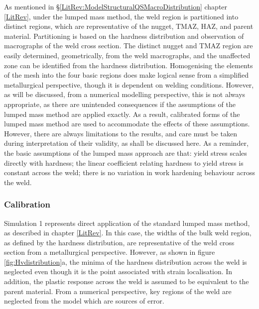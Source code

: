 As mentioned in \S\ref{LitRev:ModelStructuralQSMacroDistribution} chapter \ref{LitRev}, under the lumped mass method, the weld region is partitioned into distinct regions, which are representative of the nugget, TMAZ, HAZ, and parent material. Partitioning is based on the hardness distribution and observation of macrographs of the weld cross section. The distinct nugget and TMAZ region are easily determined, geometrically, from the weld macrographs, and the unaffected zone can be identified from the hardness distribution. Homogenising the elements of the mesh into the four basic regions does make logical sense from a simplified metallurgical perspective, though it is dependent on welding conditions. However, as will be discussed, from a numerical modelling perspective, this is not always appropriate, as there are unintended consequences if the assumptions of the lumped mass method are applied exactly. As a result, calibrated forms of the lumped mass method are used to accommodate the effects of these assumptions. However, there are always limitations to the results, and care must be taken during interpretation of their validity, as shall be discussed here. As a reminder, the basic assumptions of the lumped mass approach are that: yield stress scales directly with hardness; the linear coefficient relating hardness to yield stress is constant across the weld; there is no variation in work hardening behaviour across the weld.

\subsubsection{Calibration}
\label{SMDModellingstudyResultsSims1to4Correction1Calibration}
Simulation 1 represents direct application of the standard lumped mass method, as described in chapter \ref{LitRev}. In this case, the widths of the bulk weld region, as defined by the hardness distribution, are representative of the weld cross section from a metallurgical perspective. However, as shown in figure \ref{fig:Hvdistribution}a, the minima of the hardness distribution across the weld is neglected even though it is the point associated with strain localisation. In addition, the plastic response across the weld is assumed to be equivalent to the parent material. From a numerical perspective, key regions of the weld are neglected from the model which are sources of error.

